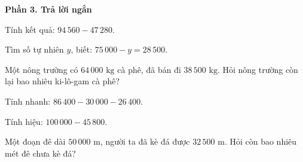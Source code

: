 \textbf{Phần 3. Trả lời ngắn}

\begin{ex} %
Tính kết quả: $94\,560 - 47\,280$.
\end{ex}

\begin{ex} %
Tìm số tự nhiên $y$, biết: $75\,000 - y = 28\,500$.
\end{ex}

\begin{ex} %
Một nông trường có $64\,000\text{ kg}$ cà phê, đã bán đi $38\,500\text{ kg}$. Hỏi nông trường còn lại bao nhiêu ki-lô-gam cà phê?
\end{ex}

\begin{ex} %
Tính nhanh: $86\,400 - 30\,000 - 26\,400$.
\end{ex}

\begin{ex} %
Tính hiệu: $100\,000 - 45\,800$.
\end{ex}

\begin{ex} %
Một đoạn đê dài $50\,000\text{ m}$, người ta đã kè đá được $32\,500\text{ m}$. Hỏi còn bao nhiêu mét đê chưa kè đá?
\end{ex}
